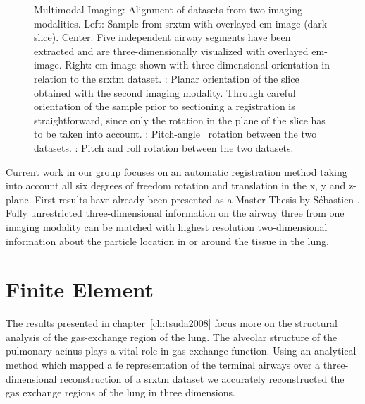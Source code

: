 \begin{figure}[h]
{%
		\label{subfig:correlation-arbitrary3}
		}%
	\caption[Multimodal Imaging]{Multimodal Imaging: Alignment of datasets from two imaging modalities. Left: Sample from \ac{srxtm} with overlayed \ac{em} image (dark slice). Center: Five independent airway segments have been extracted and are three-dimensionally visualized with overlayed \ac{em}-image. Right: \ac{em}-image shown with three-dimensional orientation in relation to the \ac{srxtm} dataset. : Planar orientation of the slice obtained with the second imaging modality. Through careful orientation of the sample prior to sectioning a registration is straightforward, since only the rotation in the plane of the slice has to be taken into account. : Pitch-angle~\cite{YawPitchRoll} rotation between the two datasets. : Pitch and roll rotation between the two datasets.}
	\label{fig:correlation}
\end{figure}

Current work in our group focuses on an automatic registration method taking into account all six degrees of freedom \ie rotation and translation in the x, y and z-plane. First results have already been presented as a Master Thesis by Sébastien \citet{Barre2009}. Fully unrestricted three-dimensional information on the airway three from one imaging modality can be matched with highest resolution two-dimensional information about the particle location in or around the tissue in the lung.

\section{Finite Element}
The results presented in chapter~\ref{ch:tsuda2008} focus more on the structural analysis of the gas-exchange region of the lung. The alveolar structure of the pulmonary acinus plays a vital role in gas exchange function. Using an analytical method which mapped a \ac{fe} representation of the terminal airways over a three-dimensional reconstruction of a \ac{srxtm} dataset we accurately reconstructed the gas exchange regions of the lung in three dimensions.

